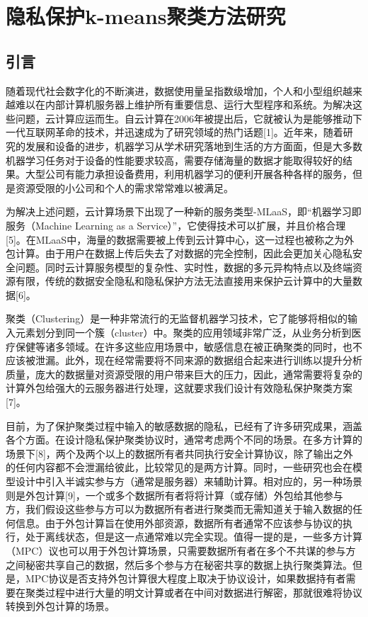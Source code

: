 \chapter{隐私保护k-means聚类方法研究}

\section{引言}
随着现代社会数字化的不断演进，数据使用量呈指数级增加，个人和小型组织越来越难以在内部计算机服务器上维护所有重要信息、运行大型程序和系统。为解决这些问题，云计算应运而生。自云计算在2006年被提出后，它就被认为是能够推动下一代互联网革命的技术，并迅速成为了研究领域的热门话题[1]。近年来，随着研究的发展和设备的进步，机器学习从学术研究落地到生活的方方面面，但是大多数机器学习任务对于设备的性能要求较高，需要存储海量的数据才能取得较好的结果。大型公司有能力承担设备费用，利用机器学习的便利开展各种各样的服务，但是资源受限的小公司和个人的需求常常难以被满足。

为解决上述问题，云计算场景下出现了一种新的服务类型-MLaaS，即“机器学习即服务（Machine Learning as a Service）”，它使得技术可以扩展，并且价格合理[5]。在MLaaS中，海量的数据需要被上传到云计算中心，这一过程也被称之为外包计算。由于用户在数据上传后失去了对数据的完全控制，因此会更加关心隐私安全问题。同时云计算服务模型的复杂性、实时性，数据的多元异构特点以及终端资源有限，传统的数据安全隐私和隐私保护方法无法直接用来保护云计算中的大量数据[6]。

聚类（Clustering）是一种非常流行的无监督机器学习技术，它了能够将相似的输入元素划分到同一个簇（cluster）中。聚类的应用领域非常广泛，从业务分析到医疗保健等诸多领域。在许多这些应用场景中，敏感信息在被正确聚类的同时，也不应该被泄漏。此外，现在经常需要将不同来源的数据组合起来进行训练以提升分析质量，庞大的数据量对资源受限的用户带来巨大的压力，因此，通常需要将复杂的计算外包给强大的云服务器进行处理，这就要求我们设计有效隐私保护聚类方案[7]。

目前，为了保护聚类过程中输入的敏感数据的隐私，已经有了许多研究成果，涵盖各个方面。在设计隐私保护聚类协议时，通常考虑两个不同的场景。在多方计算的场景下[8]，两个及两个以上的数据所有者共同执行安全计算协议，除了输出之外的任何内容都不会泄漏给彼此，比较常见的是两方计算。同时，一些研究也会在模型设计中引入半诚实参与方（通常是服务器）来辅助计算。相对应的，另一种场景则是外包计算[9]，一个或多个数据所有者将将计算（或存储）外包给其他参与方，我们假设这些参与方可以为数据所有者进行聚类而无需知道关于输入数据的任何信息。由于外包计算旨在使用外部资源，数据所有者通常不应该参与协议的执行，处于离线状态，但是这一点通常难以完全实现。值得一提的是，一些多方计算（MPC）议也可以用于外包计算场景，只需要数据所有者在多个不共谋的参与方之间秘密共享自己的数据，然后多个参与方在秘密共享的数据上执行聚类算法。但是，MPC协议是否支持外包计算很大程度上取决于协议设计，如果数据持有者需要在聚类过程中进行大量的明文计算或者在中间对数据进行解密，那就很难将协议转换到外包计算的场景。

